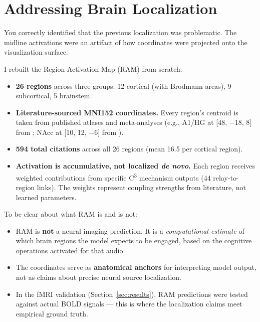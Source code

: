 \documentclass[11pt]{article}
\newcommand{\cthree}{C\textsuperscript{3}}
\begin{document}
\section{Addressing Brain Localization}
\label{sec:localization}

You correctly identified that the previous localization was problematic. The midline activations were an artifact of how coordinates were projected onto the visualization surface.

I rebuilt the Region Activation Map (RAM) from scratch:

\begin{itemize}[nosep,leftmargin=1.5em]
    \item \textbf{26 regions} across three groups: 12 cortical (with Brodmann areas), 9 subcortical, 5 brainstem.
    \item \textbf{Literature-sourced MNI152 coordinates.} Every region's centroid is taken from published atlases and meta-analyses (e.g., A1/HG at [48, $-$18, 8] from \citealt{morosan2001}; NAcc at [10, 12, $-$6] from \citealt{knutson2005}).
    \item \textbf{594 total citations} across all 26 regions (mean 16.5 per cortical region).
    \item \textbf{Activation is accumulative, not localized \emph{de novo}.} Each region receives weighted contributions from specific \cthree{} mechanism outputs (44 relay-to-region links). The weights represent coupling strengths from literature, not learned parameters.
\end{itemize}

\noindent To be clear about what RAM is and is not:

\begin{itemize}[nosep,leftmargin=1.5em]
    \item RAM is \textbf{not} a neural imaging prediction. It is a \emph{computational estimate} of which brain regions the model expects to be engaged, based on the cognitive operations activated for that audio.
    \item The coordinates serve as \textbf{anatomical anchors} for interpreting model output, not as claims about precise neural source localization.
    \item In the fMRI validation (Section~\ref{sec:results}), RAM predictions were tested against actual BOLD signals --- this is where the localization claims meet empirical ground truth.
\end{itemize}
\end{document}
